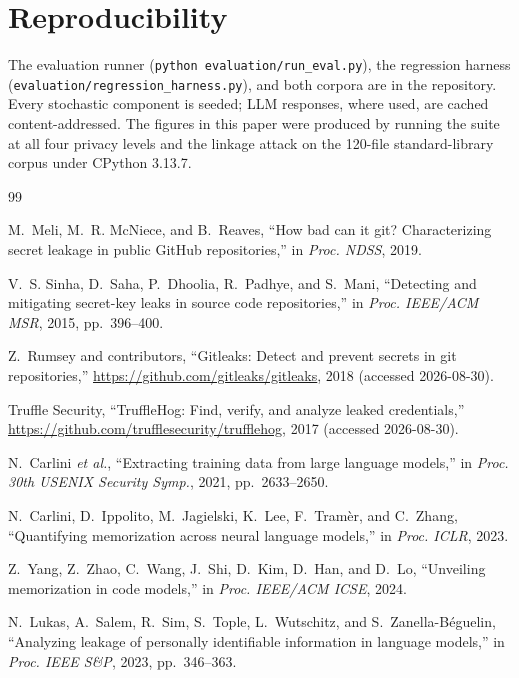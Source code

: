 \documentclass[conference]{IEEEtran}
\begin{document}
\section*{Reproducibility}

The evaluation runner (\texttt{python evaluation/run\_eval.py}), the
regression harness (\texttt{evaluation/regression\_harness.py}), and both
corpora are in the repository. Every stochastic component is seeded; LLM
responses, where used, are cached content-addressed. The figures in this
paper were produced by running the suite at all four privacy levels and
the linkage attack on the 120-file standard-library corpus under CPython
3.13.7.

\begin{thebibliography}{99}

M.~Meli, M.~R. McNiece, and B.~Reaves, ``How bad can it git? Characterizing
secret leakage in public GitHub repositories,'' in \emph{Proc. NDSS}, 2019.

V.~S. Sinha, D.~Saha, P.~Dhoolia, R.~Padhye, and S.~Mani, ``Detecting and
mitigating secret-key leaks in source code repositories,'' in \emph{Proc.
IEEE/ACM MSR}, 2015, pp.~396--400.

Z.~Rumsey and contributors, ``Gitleaks: Detect and prevent secrets in git
repositories,'' \url{https://github.com/gitleaks/gitleaks}, 2018 (accessed
2026-08-30).

Truffle Security, ``TruffleHog: Find, verify, and analyze leaked
credentials,'' \url{https://github.com/trufflesecurity/trufflehog}, 2017
(accessed 2026-08-30).

N.~Carlini \emph{et al.}, ``Extracting training data from large language
models,'' in \emph{Proc. 30th USENIX Security Symp.}, 2021, pp.~2633--2650.

N.~Carlini, D.~Ippolito, M.~Jagielski, K.~Lee, F.~Tram\`er, and C.~Zhang,
``Quantifying memorization across neural language models,'' in \emph{Proc.
ICLR}, 2023.

Z.~Yang, Z.~Zhao, C.~Wang, J.~Shi, D.~Kim, D.~Han, and D.~Lo, ``Unveiling
memorization in code models,'' in \emph{Proc. IEEE/ACM ICSE}, 2024.

N.~Lukas, A.~Salem, R.~Sim, S.~Tople, L.~Wutschitz, and
S.~Zanella-B\'eguelin, ``Analyzing leakage of personally identifiable
information in language models,'' in \emph{Proc. IEEE S\&P}, 2023,
pp.~346--363.


\end{thebibliography}
\end{document}
